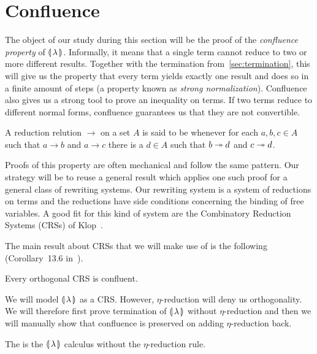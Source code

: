 \section{Confluence}
\label{sec:confluence}

The object of our study during this section will be the proof of the
\emph{confluence property} of $\llparenthesis \, \lambda \, \rrparenthesis$. Informally, it means that
a single term cannot reduce to two or more different results. Together with
the termination from~\ref{sec:termination}, this will give us the property
that every term yields exactly one result and does so in a finite amount of
steps (a property known as \emph{strong normalization}). Confluence also
gives us a strong tool to prove an inequality on terms. If two terms reduce
to different normal forms, confluence guarantees us that they are not
convertible.

\begin{definition}
  A reduction relution $\to$ on a set $A$ is said to be 
  whenever for each $a,b,c \in A$ such that $a \to b$ and $a \to c$ there
  is a $d \in A$ such that $b \twoheadrightarrow d$ and $c \twoheadrightarrow d$.
\end{definition}

Proofs of this property are often mechanical and follow the same
pattern. Our strategy will be to reuse a general result which applies one
such proof for a general class of rewriting systems. Our rewriting system
is a system of reductions on terms and the reductions have side conditions
concerning the binding of free variables. A good fit for this kind of
system are the Combinatory Reduction Systems (CRSs) of
Klop~\cite{klop1993combinatory}.

The main result about CRSs that we will make use of is the following
(Corollary~13.6 in~\cite{klop1993combinatory}).

\begin{theorem}\label{thm:confluence-crs}

  Every orthogonal CRS is confluent.
\end{theorem}

We will model ${\llparenthesis \, \lambda \, \rrparenthesis}$ as a CRS. However, $\eta$-reduction will deny us
orthogonality. We will therefore first prove termination of ${\llparenthesis \, \lambda \, \rrparenthesis}$ without
$\eta$-reduction and then we will manually show that confluence is
preserved on adding $\eta$-reduction back.

\begin{notation}
  The  is the
  $\llparenthesis \, \lambda \, \rrparenthesis$ calculus without the $\eta$-reduction rule.
\end{notation}

